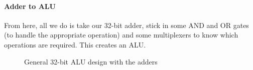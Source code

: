 \paragraph{Adder to ALU}
From here, all we do is take our 32-bit adder, stick in some AND and OR gates (to handle the appropriate operation) and some multiplexers to know which operations are required. This creates an ALU.
\begin{figure}[!htb]
	\caption{\label{fig:aluadders} General 32-bit ALU design with the adders}
\end{figure}
